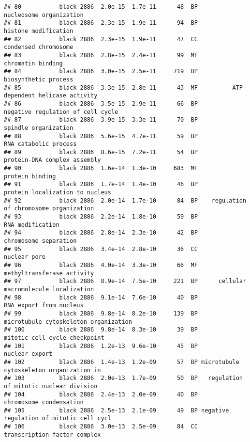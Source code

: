 \documentclass[]{article}
\begin{document}
\begin{verbatim}
## 80           black 2886  2.0e-15  1.7e-11      48  BP                  nucleosome organization
## 81           black 2886  2.3e-15  1.9e-11      94  BP                     histone modification
## 82           black 2886  2.3e-15  1.9e-11      47  CC                     condensed chromosome
## 83           black 2886  2.8e-15  2.4e-11      99  MF                        chromatin binding
## 84           black 2886  3.0e-15  2.5e-11     719  BP                     biosynthetic process
## 85           black 2886  3.3e-15  2.8e-11      43  MF          ATP-dependent helicase activity
## 86           black 2886  3.5e-15  2.9e-11      66  BP        negative regulation of cell cycle
## 87           black 2886  3.9e-15  3.3e-11      70  BP                     spindle organization
## 88           black 2886  5.6e-15  4.7e-11      59  BP                    RNA catabolic process
## 89           black 2886  8.6e-15  7.2e-11      54  BP             protein-DNA complex assembly
## 90           black 2886  1.6e-14  1.3e-10     683  MF                          protein binding
## 91           black 2886  1.7e-14  1.4e-10      46  BP          protein localization to nucleus
## 92           black 2886  2.0e-14  1.7e-10      84  BP    regulation of chromosome organization
## 93           black 2886  2.2e-14  1.8e-10      59  BP                         RNA modification
## 94           black 2886  2.8e-14  2.3e-10      42  BP                    chromosome separation
## 95           black 2886  3.4e-14  2.8e-10      36  CC                             nuclear pore
## 96           black 2886  4.0e-14  3.3e-10      66  MF               methyltransferase activity
## 97           black 2886  8.9e-14  7.5e-10     221  BP      cellular macromolecule localization
## 98           black 2886  9.1e-14  7.6e-10      40  BP                  RNA export from nucleus
## 99           black 2886  9.8e-14  8.2e-10     139  BP    microtubule cytoskeleton organization
## 100          black 2886  9.8e-14  8.3e-10      39  BP            mitotic cell cycle checkpoint
## 101          black 2886  1.2e-13  9.6e-10      45  BP                           nuclear export
## 102          black 2886  1.4e-13  1.2e-09      57  BP microtubule cytoskeleton organization in
## 103          black 2886  2.0e-13  1.7e-09      50  BP   regulation of mitotic nuclear division
## 104          black 2886  2.4e-13  2.0e-09      40  BP                  chromosome condensation
## 105          black 2886  2.5e-13  2.1e-09      49  BP negative regulation of mitotic cell cycl
## 106          black 2886  3.0e-13  2.5e-09      84  CC             transcription factor complex

\end{verbatim}
\end{document}

